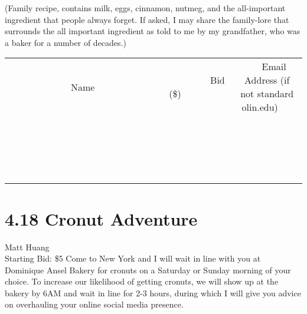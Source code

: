 \documentclass[11pt]{article}
\begin{document}
(Family recipe, contains milk, eggs, cinnamon, nutmeg, and the all-important ingredient that people always forget. If asked, I may share the family-lore that surrounds the all important ingredient as told to me by my grandfather, who was a baker for a number of decades.)
\\[3ex]
\begin{tabular}{c c c}
~~~~~~~~~~~~~Name~~~~~~~~~~~~~ & ~~~~~~~~~Bid (\$)~~~~~~~~~  & ~~~Email Address (if not standard olin.edu)~~~\\
 & & \\
\hline
 & & \\
\hline
 & & \\
\hline
 & & \\
\hline
 & & \\
\hline
 & & \\
\hline
 & & \\
\hline
 & & \\
\hline
 & & \\
\hline
 & & \\
\hline
 & & \\
\hline
 & & \\
\hline
 & & \\
\hline
 & & \\
\hline
 & & \\
\hline
 & & \\
\hline
 & & \\
\hline
 & & \\
\hline
 & & \\
\hline
\end{tabular}
\newpage
\section*{4.18 Cronut Adventure}
Matt Huang
\\
Starting Bid: \$5
\newline
Come to New York and I will wait in line with you at Dominique Ansel Bakery for cronuts on a Saturday or Sunday morning of your choice. To increase our likelihood of getting cronuts, we will show up at the bakery by 6AM and wait in line for 2-3 hours, during which I will give you advice on overhauling your online social media presence.
\end{document}
